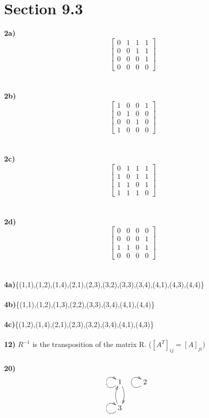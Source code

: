 \documentclass{article}
\begin{document}
\section*{Section 9.3}
\textbf{2a)}
\[
 \begin{bmatrix}
  0 & 1 & 1 & 1\\
  0 & 0 & 1 & 1\\
  0 & 0 & 0 & 1\\
  0 & 0 & 0 & 0
 \end{bmatrix}
\]
\\\\
\textbf{2b)}
\[
 \begin{bmatrix}
  1 & 0 & 0 & 1\\
  0 & 1 & 0 & 0\\
  0 & 0 & 1 & 0\\
  1 & 0 & 0 & 0
 \end{bmatrix}
\]
\\\\
\textbf{2c)}
\[
 \begin{bmatrix}
  0 & 1 & 1 & 1\\
  1 & 0 & 1 & 1\\
  1 & 1 & 0 & 1\\
  1 & 1 & 1 & 0
 \end{bmatrix}
\]
\\\\
\textbf{2d)}
\[
 \begin{bmatrix}
  0 & 0 & 0 & 0\\
  0 & 0 & 0 & 1\\
  1 & 1 & 0 & 1\\
  0 & 0 & 0 & 0
 \end{bmatrix}
\]
\\\\
\textbf{4a)}\{(1,1),(1,2),(1,4),(2,1),(2,3),(3,2),(3,3),(3,4),(4,1),(4,3),(4,4)\}
\\\\
\textbf{4b)}\{(1,1),(1,2),(1,3),(2,2),(3,3),(3,4),(4,1),(4,4)\}
\\\\
\textbf{4c)}\{(1,2),(1,4),(2,1),(2,3),(3,2),(3,4),(4,1),(4,3)\}
\\\\
\textbf{12)} $R^{-1}$ is the transposition of the matrix R. ($[A^{T}]_{ij}=[A]_{ji}$)
\\\\
\textbf{20)}
\begin{displaymath}
    \xymatrix{1 \ar@/^/[d]\ar@(dl,ul) & 2\ar@(dl,ul) \\
              3 \ar@/^/[u]\ar@(dl,ul) }
\end{displaymath}
\end{document}
